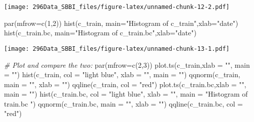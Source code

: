 \documentclass[
]{article}
\newenvironment{Shaded}{\begin{snugshade}}{\end{snugshade}}
\newcommand{\AttributeTok}[1]{\textcolor[rgb]{0.77,0.63,0.00}{#1}}
\newcommand{\CommentTok}[1]{\textcolor[rgb]{0.56,0.35,0.01}{\textit{#1}}}
\newcommand{\DecValTok}[1]{\textcolor[rgb]{0.00,0.00,0.81}{#1}}
\newcommand{\FunctionTok}[1]{\textcolor[rgb]{0.00,0.00,0.00}{#1}}
\newcommand{\NormalTok}[1]{#1}
\newcommand{\StringTok}[1]{\textcolor[rgb]{0.31,0.60,0.02}{#1}}
\begin{document}
\texttt{[image: 296Data\_SBBI\_files/figure-latex/unnamed-chunk-12-2.pdf]}

\begin{Shaded}
\begin{Highlighting}[]
\FunctionTok{par}\NormalTok{(}\AttributeTok{mfrow=}\FunctionTok{c}\NormalTok{(}\DecValTok{1}\NormalTok{,}\DecValTok{2}\NormalTok{))}
\FunctionTok{hist}\NormalTok{(c\_train, }\AttributeTok{main=}\StringTok{"Histogram of c\_train"}\NormalTok{,}\AttributeTok{xlab=}\StringTok{"date"}\NormalTok{)}
\FunctionTok{hist}\NormalTok{(c\_train.bc, }\AttributeTok{main=}\StringTok{"Histogram of c\_train.bc"}\NormalTok{,}\AttributeTok{xlab=}\StringTok{"date"}\NormalTok{)}
\end{Highlighting}
\end{Shaded}

\texttt{[image: 296Data\_SBBI\_files/figure-latex/unnamed-chunk-13-1.pdf]}

\begin{Shaded}
\begin{Highlighting}[]
\CommentTok{\# Plot and compare the two:}
\FunctionTok{par}\NormalTok{(}\AttributeTok{mfrow=}\FunctionTok{c}\NormalTok{(}\DecValTok{2}\NormalTok{,}\DecValTok{3}\NormalTok{))}
\FunctionTok{plot.ts}\NormalTok{(c\_train,}\AttributeTok{xlab =} \StringTok{""}\NormalTok{, }\AttributeTok{main =} \StringTok{""}\NormalTok{)}
\FunctionTok{hist}\NormalTok{(c\_train, }\AttributeTok{col =} \StringTok{"light blue"}\NormalTok{, }\AttributeTok{xlab =} \StringTok{""}\NormalTok{, }\AttributeTok{main =} \StringTok{""}\NormalTok{) }
\FunctionTok{qqnorm}\NormalTok{(c\_train, }\AttributeTok{main =} \StringTok{""}\NormalTok{, }\AttributeTok{xlab =} \StringTok{""}\NormalTok{)}
\FunctionTok{qqline}\NormalTok{(c\_train, }\AttributeTok{col =} \StringTok{"red"}\NormalTok{)}
\FunctionTok{plot.ts}\NormalTok{(c\_train.bc,}\AttributeTok{xlab =} \StringTok{""}\NormalTok{, }\AttributeTok{main =} \StringTok{""}\NormalTok{)}
\FunctionTok{hist}\NormalTok{(c\_train.bc, }\AttributeTok{col =} \StringTok{"light blue"}\NormalTok{, }\AttributeTok{xlab =} \StringTok{""}\NormalTok{, }\AttributeTok{main =} \StringTok{"Histogram of train.bc "}\NormalTok{)}
\FunctionTok{qqnorm}\NormalTok{(c\_train.bc, }\AttributeTok{main =} \StringTok{""}\NormalTok{, }\AttributeTok{xlab =} \StringTok{""}\NormalTok{)}
\FunctionTok{qqline}\NormalTok{(c\_train.bc, }\AttributeTok{col =} \StringTok{"red"}\NormalTok{)}
\end{Highlighting}
\end{Shaded}
\end{document}
